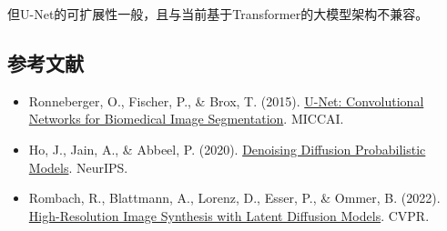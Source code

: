 但U-Net的可扩展性一般，且与当前基于Transformer的大模型架构不兼容。

\FloatBarrier
{}
\hypertarget{ux53c2ux8003ux6587ux732e-130}{%
\subsection{参考文献}\label{ux53c2ux8003ux6587ux732e-130}}

\vspace{0.25em}
\begin{itemize}
\tightlist
\item
  Ronneberger, O., Fischer, P., \& Brox, T. (2015). \href{https://arxiv.org/abs/1505.04597}{U-Net: Convolutional Networks for Biomedical Image Segmentation}. MICCAI.
\item
  Ho, J., Jain, A., \& Abbeel, P. (2020). \href{https://arxiv.org/abs/2006.11239}{Denoising Diffusion Probabilistic Models}. NeurIPS.
\item
  Rombach, R., Blattmann, A., Lorenz, D., Esser, P., \& Ommer, B. (2022). \href{https://arxiv.org/abs/2112.10752}{High-Resolution Image Synthesis with Latent Diffusion Models}. CVPR.
\end{itemize}

\clearpage
